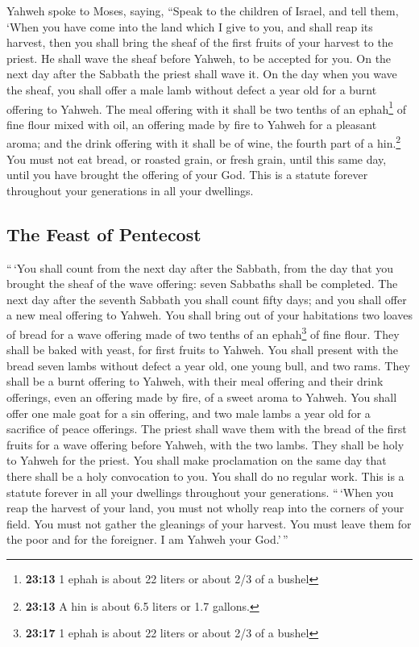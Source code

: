  Yahweh spoke to Moses, saying,  ``Speak to
the children of Israel, and tell them, `When you have come into the land
which I give to you, and shall reap its harvest, then you shall bring
the sheaf of the first fruits of your harvest to the priest.
 He shall wave the sheaf before Yahweh, to be accepted
for you. On the next day after the Sabbath the priest shall wave it.
 On the day when you wave the sheaf, you shall offer a
male lamb without defect a year old for a burnt offering to Yahweh.
 The meal offering with it shall be two tenths of an
ephah\footnote{\textbf{23:13} 1 ephah is about 22 liters or about 2/3 of
  a bushel} of fine flour mixed with oil, an offering made by fire to
Yahweh for a pleasant aroma; and the drink offering with it shall be of
wine, the fourth part of a hin.\footnote{\textbf{23:13} A hin is about
  6.5 liters or 1.7 gallons.}  You must not eat bread, or
roasted grain, or fresh grain, until this same day, until you have
brought the offering of your God. This is a statute forever throughout
your generations in all your dwellings.

\hypertarget{the-feast-of-pentecost}{%
\subsection{The Feast of Pentecost}\label{the-feast-of-pentecost}}

 ``\,`You shall count from the next day after the
Sabbath, from the day that you brought the sheaf of the wave offering:
seven Sabbaths shall be completed.  The next day after
the seventh Sabbath you shall count fifty days; and you shall offer a
new meal offering to Yahweh.  You shall bring out of your
habitations two loaves of bread for a wave offering made of two tenths
of an ephah\footnote{\textbf{23:17} 1 ephah is about 22 liters or about
  2/3 of a bushel} of fine flour. They shall be baked with yeast, for
first fruits to Yahweh.  You shall present with the bread
seven lambs without defect a year old, one young bull, and two rams.
They shall be a burnt offering to Yahweh, with their meal offering and
their drink offerings, even an offering made by fire, of a sweet aroma
to Yahweh.  You shall offer one male goat for a sin
offering, and two male lambs a year old for a sacrifice of peace
offerings.  The priest shall wave them with the bread of
the first fruits for a wave offering before Yahweh, with the two lambs.
They shall be holy to Yahweh for the priest.  You shall
make proclamation on the same day that there shall be a holy convocation
to you. You shall do no regular work. This is a statute forever in all
your dwellings throughout your generations.  ``\,`When
you reap the harvest of your land, you must not wholly reap into the
corners of your field. You must not gather the gleanings of your
harvest. You must leave them for the poor and for the foreigner. I am
Yahweh your God.'\,''


